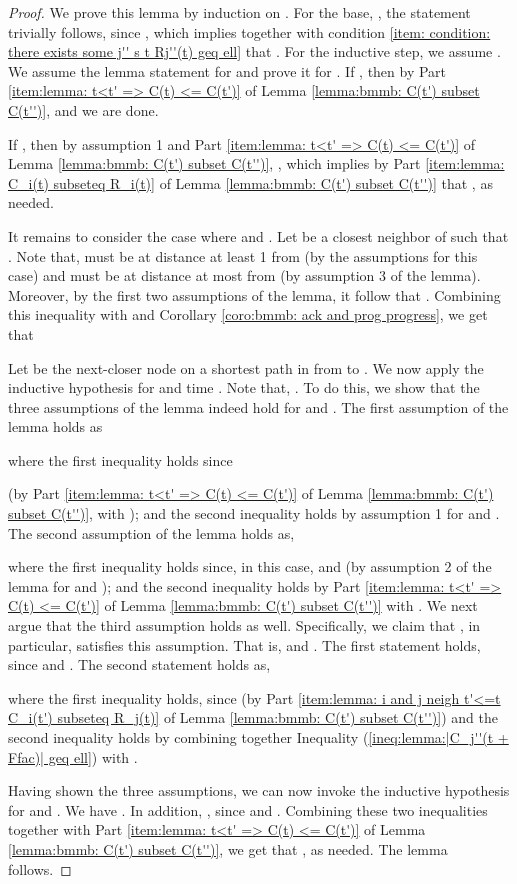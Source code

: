 \begin{proof}
We prove this lemma by induction on .
For the base, , the statement trivially follows, since , which implies together with condition
\ref{item: condition: there exists some j'' s t Rj''(t) geq ell} that .
For the inductive step, we assume .
We assume the lemma statement for  and prove it for .
If , then
by Part \ref{item:lemma: t<t' => C(t) <= C(t')}
of Lemma \ref{lemma:bmmb: C(t') subset C(t'')},
 and we are done.


If , then by  assumption 1
and Part
\ref{item:lemma: t<t' => C(t) <= C(t')}
of Lemma \ref{lemma:bmmb: C(t') subset C(t'')},
,
which implies
by Part \ref{item:lemma: C_i(t) subseteq R_i(t)}
of Lemma \ref{lemma:bmmb: C(t') subset C(t'')}
that , as needed.


It remains to consider the case where  and  .
Let  be a closest neighbor of  such that .
Note that,  must be at distance at least 1 from  (by the assumptions for this case) and  must be at distance at most  from  (by assumption 3 of the lemma).
Moreover, by the first two assumptions of the lemma, it follow that .
Combining this inequality with   and
Corollary \ref{coro:bmmb: ack and prog progress},
we get that



Let  be the next-closer node on a shortest path in  from  to .
We now apply the inductive hypothesis
for  and time .
Note that, .
To do this, we show that the three assumptions of the lemma indeed hold for  and .
The first assumption of the lemma holds as

where the first inequality holds since

(by Part \ref{item:lemma: t<t' => C(t) <= C(t')}
of Lemma \ref{lemma:bmmb: C(t') subset C(t'')},
with );
and the second inequality holds by assumption 1 for  and .
The second assumption of the lemma holds as,

where the first inequality holds since, in this case,  and  (by assumption 2 of the lemma for  and );
and the second inequality holds by Part \ref{item:lemma: t<t' => C(t) <= C(t')}
of Lemma \ref{lemma:bmmb: C(t') subset C(t'')} with .
We next argue that the third assumption holds as well.
Specifically, we claim that , in particular, satisfies this assumption.
That is,
 and .
The first statement holds, since  and .
The second statement holds as,

where the first inequality holds,
since 
(by Part \ref{item:lemma: i and j neigh t'<=t C_i(t') subseteq R_j(t)}
of Lemma \ref{lemma:bmmb: C(t') subset C(t'')})
and the second inequality holds
by combining together Inequality (\ref{ineq:lemma:|C_j''(t + Ffac)| geq ell}) with .


Having shown the three assumptions, we can now invoke the inductive hypothesis for  and .
We have .
In addition, , since  and .
Combining these two inequalities together with
Part \ref{item:lemma: t<t' => C(t) <= C(t')}
of Lemma \ref{lemma:bmmb: C(t') subset C(t'')},
we get that
, as needed.
The lemma follows.
\end{proof}






